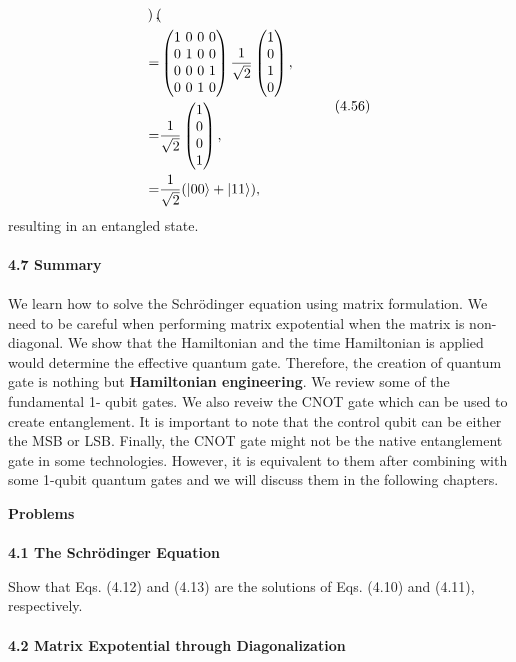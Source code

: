 \documentclass{article}
\begin{document}
\begin{align}
\begin{split}
\begin{pmatrix}
        \end{pmatrix},\\
        =&\begin{pmatrix}
            1\ 0\ 0\ 0\\ 0\ 1\ 0\ 0\\ 0\ 0\ 0\ 1\\0\ 0\ 1\ 0
        \end{pmatrix}\frac{1}{\sqrt{2}}
        \begin{pmatrix}
            1\\0\\1\\0
        \end{pmatrix},\\
        =&\frac{1}{\sqrt{2}}\begin{pmatrix}
            1\\0\\0\\1
        \end{pmatrix},\\
        =&\frac{1}{\sqrt{2}}(\ket{00}+\ket{11}),
    \end{split}\tag{4.56}
\end{align}
resulting in an entangled state.\\\\
\textbf{\large 4.7 Summary}
\\\\
We learn how to solve the Schr\"{o}dinger equation using matrix formulation.
We need to be careful when performing matrix expotential when the matrix is non-diagonal.
We show that the Hamiltonian and the time Hamiltonian is applied would
determine the effective quantum gate. Therefore, the creation of quantum gate is 
nothing but \textbf{Hamiltonian engineering}. We review some of the fundamental 
1- qubit gates. We also reveiw the CNOT gate which can be used to create entanglement.
It is important to note that the control qubit can be either the MSB or LSB.
Finally, the CNOT gate might not be the native entanglement gate in some technologies.
However, it is equivalent to them after combining with some 1-qubit quantum gates and we will
discuss them in the following chapters.

\textbf{\large Problems}\\\\
\textbf{4.1 The Schr\"{o}dinger Equation}

Show that Eqs. (4.12) and (4.13) are the solutions of Eqs. (4.10) and (4.11), respectively.
\\\\
\textbf{4.2 Matrix Expotential through Diagonalization}
\end{document}
